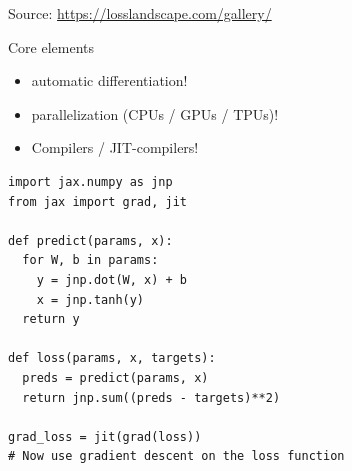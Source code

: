 \documentclass[
    xcolor={svgnames,dvipsnames},
    hyperref={colorlinks, citecolor=DeepPink4, linkcolor=DarkRed, urlcolor=DarkBlue}
    ]{beamer}  %
\newcommand{\1}{\mathbbm 1}
\begin{document}
\begin{frame}
    
    \begin{figure}
       \begin{center}
       \end{center}
    \end{figure}

    Source: \url{https://losslandscape.com/gallery/}

\end{frame}

\begin{frame}
    

    Core elements
    \begin{itemize}
        \item automatic differentiation!
        \vspace{0.5em}
        \item parallelization (CPUs / GPUs / TPUs)!
        \vspace{0.5em}
        \item Compilers / JIT-compilers!
    \end{itemize}

\end{frame}


\begin{frame}[fragile]
    
    \begin{verbatim}
import jax.numpy as jnp
from jax import grad, jit

def predict(params, x):
  for W, b in params:
    y = jnp.dot(W, x) + b
    x = jnp.tanh(y)  
  return y                

def loss(params, x, targets):
  preds = predict(params, x)
  return jnp.sum((preds - targets)**2)

grad_loss = jit(grad(loss))  
# Now use gradient descent on the loss function
    \end{verbatim}

\end{frame}
\end{document}

